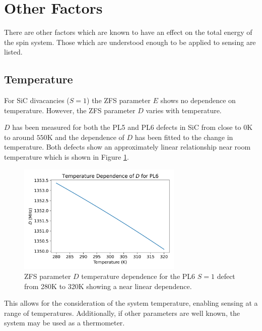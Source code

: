\section{Other Factors}
There are other factors which are known to have an effect on the total energy of the spin system. Those which are understood enough to be applied to sensing are listed.
\subsection{Temperature}\label{D_vs_temp}
For SiC divacancies ($S=1$) the ZFS parameter $E$ shows no dependence on temperature. However, the ZFS parameter $D$ varies with temperature.

$D$ has been measured for both the PL5 and PL6 defects in SiC from close to $0$K to around $550$K and the dependence of $D$ has been fitted to the change in temperature.
Both defects show an approximately linear relationship near room temperature which is shown in Figure \ref{fig:PL5PL6DvsT}.



\begin{figure}[H]
	\begin{center}
		\includegraphics[width=0.7\textwidth]{figures/SiC-PL5PL6-D(T)-close.png}
		\caption{ZFS parameter $D$ temperature dependence for the PL6 $S=1$ defect from 280K to 320K showing a near linear dependence. }\label{fig:PL5PL6DvsT}
	\end{center}
\end{figure}


This allows for the consideration of the system temperature, enabling sensing at a range of temperatures. Additionally, if other parameters are well known, the system may be used as a thermometer.

